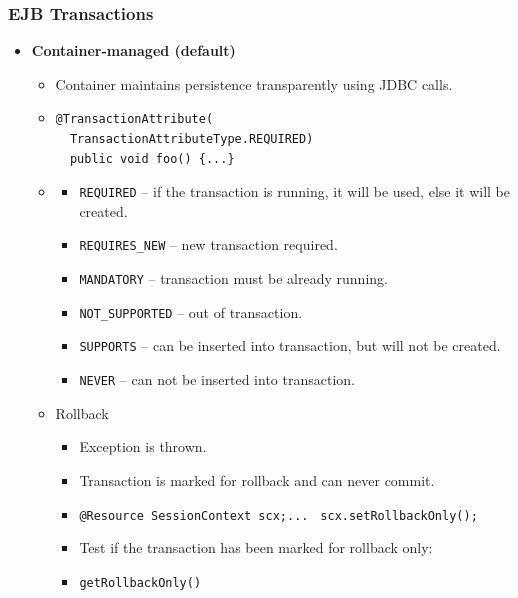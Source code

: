 \documentclass[10pt,xcolor=pdflatex]{beamer}
\begin{document}
\begin{frame}[fragile]\frametitle{EJB Transactions}
\begin{itemize}
  \item \textbf{Container-managed (default)}
    \begin{itemize}
      \item {\footnotesize Container maintains persistence transparently using JDBC calls.}
      \item[]
        \medskip
        {\footnotesize\begin{verbatim}
@TransactionAttribute(
  TransactionAttributeType.REQUIRED)
  public void foo() {...}         
                    \end{verbatim}}
      \item[] 
        \begin{itemize}
          \item \texttt{REQUIRED} -- if the transaction is running, it will be used, else it will be created.
          \item \texttt{REQUIRES\_NEW} -- new transaction required.
          \item \texttt{MANDATORY} -- transaction must be already running.
          \item \texttt{NOT\_SUPPORTED} -- out of transaction.
          \item \texttt{SUPPORTS} -- can be inserted into transaction, but will not be created.
          \item \texttt{NEVER} -- can not be inserted into transaction.
        \end{itemize}
      \item Rollback
        \begin{itemize}
          \item Exception is thrown.
          \item Transaction is marked for rollback and can never commit.
          \item[] {\footnotesize \texttt{@Resource SessionContext scx;}\linebreak \texttt{...} \linebreak\texttt{ scx.setRollbackOnly();}}
          \item Test if the transaction has been marked for rollback only:
          \item[] \texttt{getRollbackOnly()}
        \end{itemize}
    \end{itemize}
\end{itemize}
\end{frame}
\end{document}
